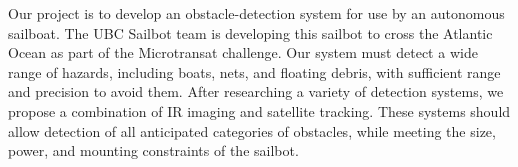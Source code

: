 Our project is to develop an obstacle-detection system for use by an autonomous sailboat.  The UBC Sailbot team is developing this sailbot to cross the Atlantic Ocean as part of the Microtransat challenge.  Our system must detect a wide range of hazards, including boats, nets, and floating debris, with sufficient range and precision to avoid them.  After researching a variety of detection systems, we propose a combination of IR imaging and satellite tracking.  These systems should allow detection of all anticipated categories of obstacles, while meeting the size, power, and mounting constraints of the sailbot.
